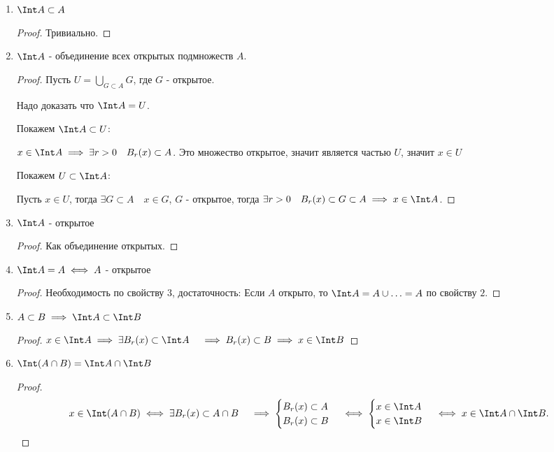 \begin{theorem} \thmslashn

    \begin{enumerate}
        \item $\Int A \subset A$
            \begin{proof}
                Тривиально.
            \end{proof}
        \item $\Int A$ - объединение всех открытых подмножеств $A$.
            \begin{proof}
                
                Пусть $U = \bigcup_{G \subset A} G $, где $G$ - открытое.

                Надо доказать что $\Int A = U$.

                Покажем $\Int A \subset U$:

                $x\in \Int A \implies \exists{r > 0}\quad B_{r}(x) \subset A$. Это множество открытое, значит является частью $U$, значит $x\in U$

                Покажем $U \subset \Int A$:

                Пусть $x\in U$, тогда $\exists{G \subset A}\quad x\in G$, $G$ - открытое, тогда $\exists{r > 0}\quad B_{r}(x) \subset G \subset A \implies x\in \Int A$.
            \end{proof}
        \item $\Int A$ - открытое
            \begin{proof}
                Как объединение открытых.
            \end{proof}
        \item $\Int A = A \iff A$ - открытое
            \begin{proof}
                 Необходимость по свойству $3$, достаточность: Если $A$ открыто, то $\Int A = A \cup \ldots = A$ по свойству $2$.
            \end{proof}
        \item $A \subset B \implies \Int A \subset \Int B$
            \begin{proof}
                $x\in \Int A \implies \exists{B_{r}(x) \subset \Int A}\quad \implies B_{r}(x) \subset B \implies x\in \Int B$ 
            \end{proof}
        \item $\Int (A\cap B) = \Int A\cap \Int B$
            \begin{proof}
                \[x\in \Int (A\cap B) \iff \exists{B_{r}(x) \subset A\cap B}\quad \implies \begin{cases}
                    B_{r}(x) \subset A\\
                    B_{r}(x) \subset  B
                \end{cases} \iff \begin{cases}
                    x\in \Int A\\
                    x\in \Int B
                \end{cases} \iff x\in \Int A\cap \Int B.\]
                

\end{proof}
\end{enumerate}
\end{theorem}
